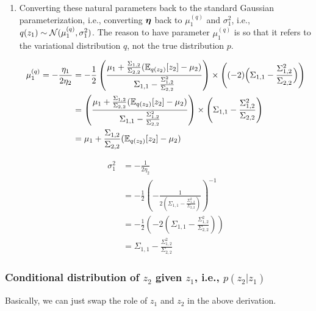 \documentclass{article}
\begin{document}
\begin{enumerate}
\item
Converting these natural parameters back to the standard Gaussian parameterization, i.e., converting $\boldsymbol{\eta}$ back to $\mu^{(q)}_1$ and $\sigma^2_1$, i.e., $q(z_1) \sim \mathcal{N}(\mu_1^{(q)},\sigma_1^2)$. The reason to have parameter $\mu_1^{(q)}$ is so that it refers to the variational distribution $q$, not the true distribution $p$.

\begin{equation}\begin{split}
\mu^{(q)}_1 = -\frac{\eta_1}{2\eta_2} &= - \frac{1}{2} \left( \frac{\mu_1 + \frac{\Sigma_{1,2}}{\Sigma_{2,2}}(\mathbb{E}_{q(z_2)}[z_2] - \mu_2)}{\Sigma_{1,1} - \frac{\Sigma_{1,2}^2}{\Sigma_{2,2}}} \right) \times  \left( (-2) \Big( \Sigma_{1,1} - \frac{\Sigma_{1,2}^2}{\Sigma_{2,2}}\Big) \right) \\
&= \left( \frac{\mu_1 + \frac{\Sigma_{1,2}}{\Sigma_{2,2}}(\mathbb{E}_{q(z_2)}[z_2] - \mu_2)}{\Sigma_{1,1} - \frac{\Sigma_{1,2}^2}{\Sigma_{2,2}}} \right) \times  \left(  \Sigma_{1,1} - \frac{\Sigma_{1,2}^2}{\Sigma_{2,2}}\right) \\
&= \mu_1 + \frac{\Sigma_{1,2}}{\Sigma_{2,2}}(\mathbb{E}_{q(z_2)}[z_2] - \mu_2)\\
\end{split}\end{equation}

\begin{equation}\begin{split}
\sigma_1^2 &= -\frac{1}{2\eta_2} \\
&= -\frac{1}{2} \left(-\frac{1}{2(\Sigma_{1,1} - \frac{\Sigma_{1,2}^2}{\Sigma_{2,2}})}\right)^{-1} \\
&= -\frac{1}{2} \left(-2(\Sigma_{1,1} - \frac{\Sigma_{1,2}^2}{\Sigma_{2,2}})\right) \\
&= \Sigma_{1,1} - \frac{\Sigma_{1,2}^2}{\Sigma_{2,2}}
\end{split}\end{equation}


\end{enumerate}
	

\subsubsection{Conditional distribution of $z_2$ given $z_1$, i.e., $p(z_2 | z_1)$}

Basically, we can just swap the role of $z_1$ and $z_2$ in the above derivation.
\end{document}
